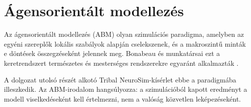 \section{Ágensorientált modellezés}

Az ágensorientált modellezés (ABM) olyan szimulációs paradigma, amelyben az egyéni szereplők lokális szabályok alapján cselekszenek, és a makroszintű minták e döntések összegzéseként jelennek meg. Bonabeau és munkatársai ezt a keretrendszert természetes és mesterséges rendszerekre egyaránt alkalmazták \cite{bonabeau2002}.

A dolgozat utolsó részét alkotó Tribal NeuroSim-kísérlet ebbe a paradigmába illeszkedik. Az ABM-irodalom hangsúlyozza: a szimulációból kapott eredményt a modell viselkedéseként kell értelmezni, nem a valóság közvetlen leképezéseként.
